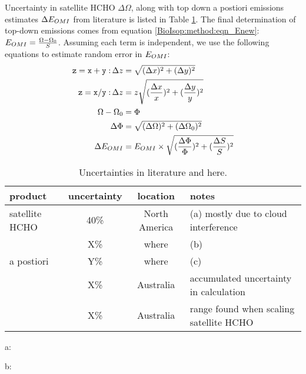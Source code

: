     Uncertainty in satellite HCHO $\Delta{\Omega}$, along with top down a postiori emissions estimates $\Delta{E_{OMI}}$ from literature is listed in Table \ref{BioIsop:uncertainty:eomi:tab_lit_uncertainties}.
    The final determination of top-down emissions comes from equation \ref{BioIsop:method:eqn_Enew}: $E_{OMI}=\frac{\Omega - \Omega_{0}}{S}$.
    Assuming each term is independent, we use the following equations to estimate random error in $E_{OMI}$:
    \begin{align*}
      \mathtt{z=x+y:} \, \Delta{z} & = \sqrt{(\Delta{x})^2 + (\Delta{y})^2} \\
      \mathtt{z=x/y:} \, \Delta{z} & = z \sqrt{(\frac{\Delta{x}}{x})^2 + (\frac{\Delta{y}}{y})^2} \\
      \Omega - \Omega_{0} & = \Phi \\
      \Delta{\Phi} & = \sqrt{(\Delta{\Omega})^2 + (\Delta{\Omega_{0}})^2} \\
      \Delta{E_{OMI}} &= E_{OMI} \times \sqrt{(\frac{\Delta{\Phi}}{\Phi})^2 + (\frac{\Delta{S}}{S})^2}
    \end{align*}
    
    \begin{table}\begin{threeparttable}
      \caption{Uncertainties in literature and here.}
      \begin{tabular}{ l | c  c  l } 
        \toprule
        product & uncertainty & location & notes \\
        \midrule
        satellite HCHO & 40\% & North America & (a) mostly due to cloud interference \\
         & X\% & where & (b) \\
        a postiori & Y\% & where & (c) \\
         & X\% & Australia & accumulated uncertainty in calculation \\
         & X\% & Australia & range found when scaling satellite HCHO \\
        \bottomrule
      \end{tabular}
      \begin{tablenotes} 
        \item a: \textcite{Millet2006,Palmer2006}
        \item b: 
      \end{tablenotes}
      \label{BioIsop:uncertainty:eomi:tab_lit_uncertainties}
    \end{threeparttable}\end{table}
    
